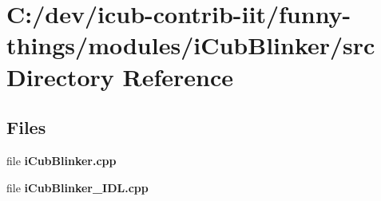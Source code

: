 \section{C\+:/dev/icub-\/contrib-\/iit/funny-\/things/modules/i\+Cub\+Blinker/src Directory Reference}
\label{dir_8b48ebb685241ce8c8f92ab0da5f32f9}
\subsection*{Files}
\begin{DoxyCompactItemize}
\item 
file {\bfseries i\+Cub\+Blinker.\+cpp}
\item 
file {\bfseries i\+Cub\+Blinker\+\_\+\+I\+D\+L.\+cpp}
\end{DoxyCompactItemize}

